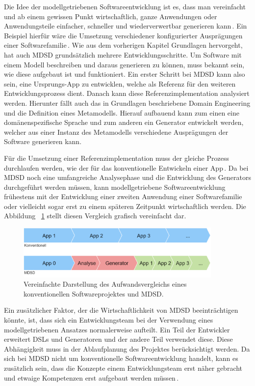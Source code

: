 \documentclass[12pt,oneside,a4paper,parskip]{scrbook}
\begin{document}
Die Idee der modellgetriebenen Softwareentwicklung ist es, dass man vereinfacht und ab einem gewissen Punkt wirtschaftlich, ganze Anwendungen oder Anwendungsteile einfacher, schneller und wiederverwertbar generieren kann\,\cite[S.\,14f.]{stahl2007}. Ein Beispiel hierfür wäre die Umsetzung verschiedener konfigurierter Ausprägungen einer Softwarefamilie\,\cite[S.\,237ff.]{stahl2007}. Wie aus dem vorherigen Kapitel Grundlagen hervorgeht, hat auch MDSD grundsätzlich mehrere Entwicklungsschritte. Um Software mit einem Modell beschreiben und daraus generieren zu können, muss bekannt sein, wie diese aufgebaut ist und funktioniert. Ein erster Schritt bei MDSD kann also sein, eine Ursprungs-App zu entwicklen, welche als Referenz für den weiteren Entwicklungsprozess dient. Danach kann diese Referenzimplementation analysiert werden. Hierunter fällt auch das in Grundlagen beschriebene Domain Engineering und die Definition eines Metamodells. Hierauf aufbauend kann zum einen eine domänenspezifische Sprache und zum anderen ein Generator entwickelt werden, welcher aus einer Instanz des Metamodells verschiedene Ausprägungen der Software generieren kann.

Für die Umsetzung einer Referenzimplementation muss der gleiche Prozess durchlaufen werden, wie der für das konventionelle Entwickeln einer App\,\cite[S.\,219f.]{stahl2007}. Da bei MDSD noch eine umfangreiche Analysephase und die Entwicklung des Generators durchgeführt werden müssen, kann modellgetriebene Softwareentwicklung frühestens mit der Entwicklung einer zweiten Anwendung einer Softwarefamilie oder vielleicht sogar erst zu einem späteren Zeitpunkt wirtschaftlich werden. Die Abbildung ~\ref{fig:vgl1} stellt diesen Vergleich grafisch vereinfacht dar.

\begin{figure}[htbp]
\centering
\includegraphics[width=0.9\textwidth]{bilder/vergleich_1}
\caption{Vereinfachte Darstellung des Aufwandsvergleichs eines konventionellen Softwareprojektes und MDSD.}
\label{fig:vgl1}
\end{figure}

Ein zusätzlicher Faktor, der die Wirtschaftlichkeit von MDSD beeinträchtigen könnte, ist, dass sich ein Entwicklungsteam bei der Verwendung eines modellgetriebenen Ansatzes normalerweise aufteilt. Ein Teil der Entwickler erweitert DSLs und Generatoren und der andere Teil verwendet diese. Diese Abhängigkeit muss in der Ablaufplanung des Projektes berücksichtigt werden. Da sich bei MDSD nicht um konventionelle Softwareentwicklung handelt, kann es zusätzlich sein, dass die Konzepte einem Entwicklungsteam erst näher gebracht und etwaige Kompetenzen erst aufgebaut werden müssen\,\cite[S.\,44ff.]{voelter2013}.
\end{document}
